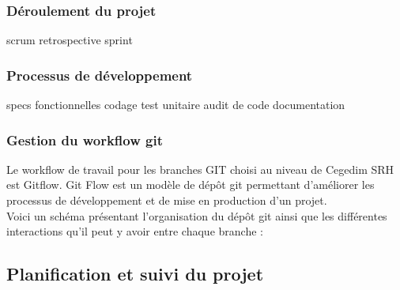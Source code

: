 \subsubsection{Déroulement du projet}
scrum
retrospective 
sprint
\subsubsection{Processus de développement}
specs fonctionnelles
codage
test unitaire
audit de code
documentation
\subsubsection{Gestion du workflow git}
Le workflow de travail pour les branches GIT choisi au niveau de Cegedim SRH est Gitflow. Git Flow est un modèle de dépôt git permettant d'améliorer les processus de développement et de mise en production d'un projet.\\
Voici un schéma présentant l'organisation du dépôt git ainsi que les différentes interactions qu'il peut y avoir entre chaque branche :
\subsection{Planification et suivi du projet}
